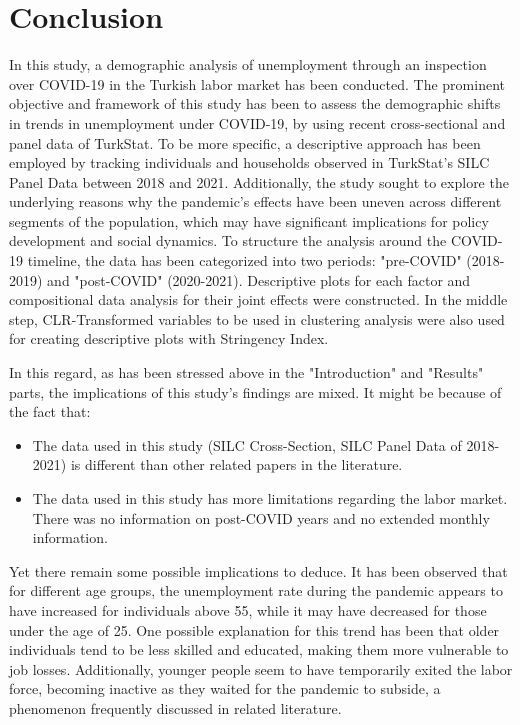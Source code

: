 \documentclass[a4paper,12pt]{article}
\begin{document}
\section{Conclusion}
In this study, a demographic analysis of unemployment through an inspection over COVID-19 in the Turkish labor market has been conducted. The prominent objective and framework of this study has been to assess the demographic shifts in trends in unemployment under COVID-19, by using recent cross-sectional and panel data of TurkStat. To be more specific, a descriptive approach has been employed by tracking individuals and households observed in TurkStat’s SILC Panel Data between 2018 and 2021. Additionally, the study sought to explore the underlying reasons why the pandemic’s effects have been uneven across different segments of the population, which may have significant implications for policy development and social dynamics. To structure the analysis around the COVID-19 timeline, the data has been categorized into two periods: "pre-COVID" (2018-2019) and "post-COVID" (2020-2021). Descriptive plots for each factor and compositional data analysis for their joint effects were constructed. In the middle step, CLR-Transformed variables to be used in clustering analysis were also used for creating descriptive plots with Stringency Index.

In this regard, as has been stressed above in the "Introduction" and "Results" parts, the implications of this study's findings are mixed. It might be because of the fact that:
\begin{itemize}
    \item The data used in this study (SILC Cross-Section, SILC Panel Data of 2018-2021) is different than other related papers in the literature.
    \item The data used in this study has more limitations regarding the labor market. There was no information on post-COVID years and no extended monthly information.
\end{itemize}

Yet there remain some possible implications to deduce. It has been observed that for different age groups, the unemployment rate during the pandemic appears to have increased for individuals above 55, while it may have decreased for those under the age of 25. One possible explanation for this trend has been that older individuals tend to be less skilled and educated, making them more vulnerable to job losses. Additionally, younger people seem to have temporarily exited the labor force, becoming inactive as they waited for the pandemic to subside, a phenomenon frequently discussed in related literature.
\end{document}
